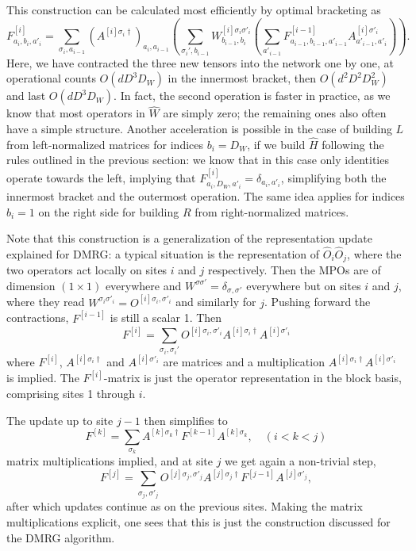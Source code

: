 \documentclass[a4paper,10pt,oneside,onecolumn,1p,times]{elsarticle}
\begin{document}
This construction can be calculated most efficiently by optimal bracketing as 
\begin{equation}
F^{[i]}_{a_i,b_{i},a'_i} = \sum_{\sigma_i,a_{i-1}}
(A^{[i]\sigma_i\dagger})_{a_i,a_{i-1}} 
\left( \sum_{\sigma_i',b_{i-1}}
W^{[i]\sigma_i\sigma'_i}_{b_{i-1},b_{i}}
\left( \sum_{a'_{i-1}} F^{[i-1]}_{a_{i-1},b_{i-1},a'_{i-1}} A^{[i]\sigma'_i}_{a'_{i-1},a'_i}  \right) \right) .
\end{equation}
Here, we have contracted the three new tensors into the network one by one, at operational counts $O(dD^3 D_W)$ in the innermost bracket, then $O(d^2 D^2 D_W^2)$ and last $O(d D^3 D_W)$. In fact, the second operation is faster in practice, as we know that most operators in $\hat{W}$ are simply zero; the remaining ones also often have a simple structure. Another acceleration is possible in the case of building $L$ from left-normalized matrices for indices $b_i=D_W$, if we build $\hat{H}$ following the rules outlined in the previous section: we know that in this case only identities operate towards the left, implying that $F^{[i]}_{a_i,D_W,a'_i} = \delta_{a_i,a'_i}$, simplifying both the innermost bracket and the outermost operation. The same idea applies for indices $b_i=1$ on the right side for building $R$ from right-normalized matrices.

Note that this construction is a generalization of the representation update explained for DMRG: a typical situation is the representation of $\hat{O}_i \hat{O}_j$, where the two operators act locally on sites $i$ and $j$ respectively. Then the MPOs are of dimension $(1\times 1)$ everywhere and $W^{\sigma\sigma'} = \delta_{\sigma,\sigma'}$ everywhere but on sites $i$ and $j$, where they read $W^{\sigma_i\sigma'_i} = O^{[i]\sigma_i,\sigma'_i}$ and similarly for $j$. Pushing forward the contractions, $F^{[i-1]}$ is still a scalar 1. Then
\begin{equation}
F^{[i]} =  \sum_{\sigma_i,\sigma_i'} O^{[i]\sigma_i,\sigma'_i} A^{[i]\sigma_i\dagger} A^{[i]\sigma'_i}
\end{equation}
where $F^{[i]}$, $A^{[i]\sigma_i\dagger}$ and $A^{[i]\sigma'_i}$ are matrices and a multiplication $A^{[i]\sigma_i\dagger} A^{[i]\sigma'_i}$ is implied. The $F^{[i]}$-matrix is just the operator representation in the block basis, comprising sites 1 through $i$. 

The update up to site $j-1$ then simplifies to
\begin{equation}
F^{[k]} =  \sum_{\sigma_k} A^{[k]\sigma_k\dagger} F^{[k-1]} A^{[k]\sigma_k} ,\quad (i<k<j)
\end{equation}
matrix multiplications implied, and at site $j$ we get again a non-trivial step,
\begin{equation}
F^{[j]} = \sum_{\sigma_j,\sigma'_j} O^{[j]\sigma_j,\sigma'_j} A^{[j]\sigma_j\dagger} F^{[j-1]} A^{[j]\sigma'_j},
\end{equation}
after which updates continue as on the previous sites. Making the matrix multiplications explicit, one sees that this is just the construction discussed for the DMRG algorithm.
  
\end{document}
